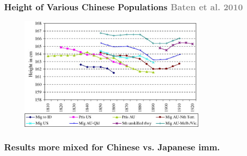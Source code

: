 \documentclass[xcolor=dvipsnames, compress, 12pt, aspectratio=169, handout]{beamer}
\begin{document}
\begin{frame}
    \label{baten_graph}
    \frametitle{Height of Various Chinese Populations \textcolor{gray}{Baten et al. 2010} \hyperlink{height2}{}}
    \centering
    \begin{figure}
        \includegraphics[width = 0.8\textwidth]{../../figs/slides/batenetal_heights.jpeg}
    \end{figure}
\end{frame}


\begin{frame}
    \label{reg_sel2}
    \frametitle{Results more mixed for Chinese vs. Japanese imm. \hyperlink{reg_sel1}{}}
    \centering
    \begin{table}
        \resizebox{0.9\textwidth}{!}{}
    \end{table}
\end{frame}
\end{document}
